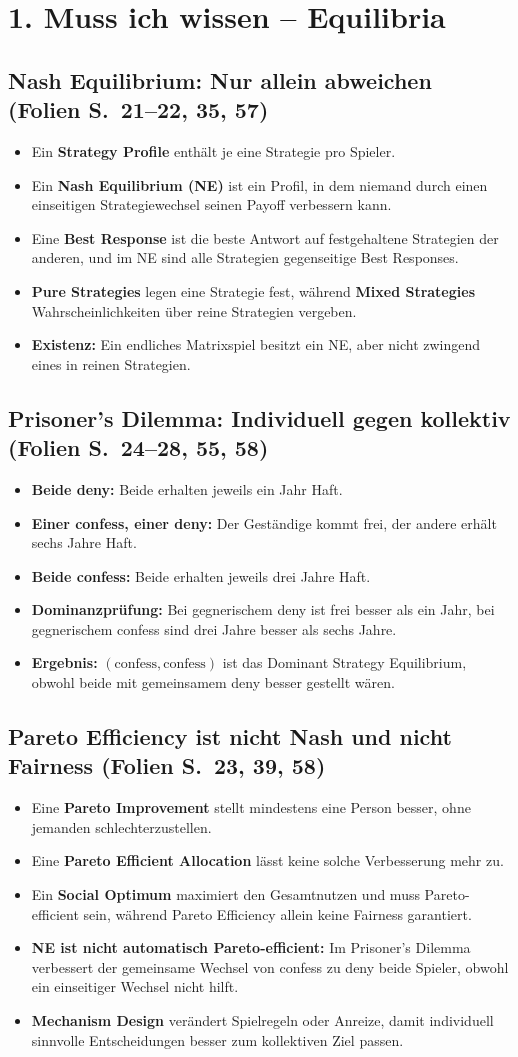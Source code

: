 \documentclass[11pt,a4paper]{article}
\newcommand{\block}[2]{\subsection*{#1 {\normalfont\small (Folien S.~#2)}}}
\begin{document}
\section*{1. Muss ich wissen -- Equilibria}
\block{Nash Equilibrium: Nur allein abweichen}{21--22, 35, 57}
\begin{itemize}
\item Ein \textbf{Strategy Profile} enthält je eine Strategie pro Spieler.
\item Ein \textbf{Nash Equilibrium (NE)} ist ein Profil, in dem niemand durch einen einseitigen Strategiewechsel seinen Payoff verbessern kann.
\item Eine \textbf{Best Response} ist die beste Antwort auf festgehaltene Strategien der anderen, und im NE sind alle Strategien gegenseitige Best Responses.
\item \textbf{Pure Strategies} legen eine Strategie fest, während \textbf{Mixed Strategies} Wahrscheinlichkeiten über reine Strategien vergeben.
\item \textbf{Existenz:} Ein endliches Matrixspiel besitzt ein NE, aber nicht zwingend eines in reinen Strategien.
\end{itemize}
\block{Prisoner's Dilemma: Individuell gegen kollektiv}{24--28, 55, 58}
\begin{itemize}
\item \textbf{Beide deny:} Beide erhalten jeweils ein Jahr Haft.
\item \textbf{Einer confess, einer deny:} Der Geständige kommt frei, der andere erhält sechs Jahre Haft.
\item \textbf{Beide confess:} Beide erhalten jeweils drei Jahre Haft.
\item \textbf{Dominanzprüfung:} Bei gegnerischem deny ist frei besser als ein Jahr, bei gegnerischem confess sind drei Jahre besser als sechs Jahre.
\item \textbf{Ergebnis:} $(\text{confess},\text{confess})$ ist das Dominant Strategy Equilibrium, obwohl beide mit gemeinsamem deny besser gestellt wären.
\end{itemize}
\block{Pareto Efficiency ist nicht Nash und nicht Fairness}{23, 39, 58}
\begin{itemize}
\item Eine \textbf{Pareto Improvement} stellt mindestens eine Person besser, ohne jemanden schlechterzustellen.
\item Eine \textbf{Pareto Efficient Allocation} lässt keine solche Verbesserung mehr zu.
\item Ein \textbf{Social Optimum} maximiert den Gesamtnutzen und muss Pareto-efficient sein, während Pareto Efficiency allein keine Fairness garantiert.
\item \textbf{NE ist nicht automatisch Pareto-efficient:} Im Prisoner's Dilemma verbessert der gemeinsame Wechsel von confess zu deny beide Spieler, obwohl ein einseitiger Wechsel nicht hilft.
\item \textbf{Mechanism Design} verändert Spielregeln oder Anreize, damit individuell sinnvolle Entscheidungen besser zum kollektiven Ziel passen.
\end{itemize}
\end{document}

